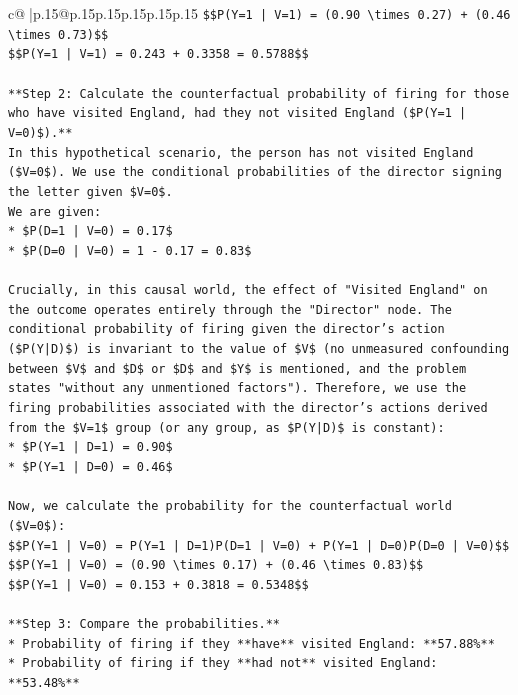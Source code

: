 \documentclass{article}
\begin{document}
{\begin{supertabular}{c@{$\;$}|p{.15\linewidth}@{}p{.15\linewidth}p{.15\linewidth}p{.15\linewidth}p{.15\linewidth}p{.15\linewidth}}
{{{\texttt{\$\$P(Y=1 | V=1) = (0.90 \textbackslash{}times 0.27) + (0.46 \textbackslash{}times 0.73)\$\$} \\
\texttt{\$\$P(Y=1 | V=1) = 0.243 + 0.3358 = 0.5788\$\$} \\
\\ 
\texttt{**Step 2: Calculate the counterfactual probability of firing for those who have visited England, had they not visited England (\$P(Y=1 | V=0)\$).**} \\
\texttt{In this hypothetical scenario, the person has not visited England (\$V=0\$). We use the conditional probabilities of the director signing the letter given \$V=0\$.} \\
\texttt{We are given:} \\
\texttt{*   \$P(D=1 | V=0) = 0.17\$} \\
\texttt{*   \$P(D=0 | V=0) = 1 {-} 0.17 = 0.83\$} \\
\\ 
\texttt{Crucially, in this causal world, the effect of "Visited England" on the outcome operates entirely through the "Director" node. The conditional probability of firing given the director's action (\$P(Y|D)\$) is invariant to the value of \$V\$ (no unmeasured confounding between \$V\$ and \$D\$ or \$D\$ and \$Y\$ is mentioned, and the problem states "without any unmentioned factors"). Therefore, we use the firing probabilities associated with the director's actions derived from the \$V=1\$ group (or any group, as \$P(Y|D)\$ is constant):} \\
\texttt{*   \$P(Y=1 | D=1) = 0.90\$} \\
\texttt{*   \$P(Y=1 | D=0) = 0.46\$} \\
\\ 
\texttt{Now, we calculate the probability for the counterfactual world (\$V=0\$):} \\
\texttt{\$\$P(Y=1 | V=0) = P(Y=1 | D=1)P(D=1 | V=0) + P(Y=1 | D=0)P(D=0 | V=0)\$\$} \\
\texttt{\$\$P(Y=1 | V=0) = (0.90 \textbackslash{}times 0.17) + (0.46 \textbackslash{}times 0.83)\$\$} \\
\texttt{\$\$P(Y=1 | V=0) = 0.153 + 0.3818 = 0.5348\$\$} \\
\\ 
\texttt{**Step 3: Compare the probabilities.**} \\
\texttt{*   Probability of firing if they **have** visited England: **57.88\%**} \\
\texttt{*   Probability of firing if they **had not** visited England: **53.48\%**} \\
}}}
\end{supertabular}}
\end{document}
